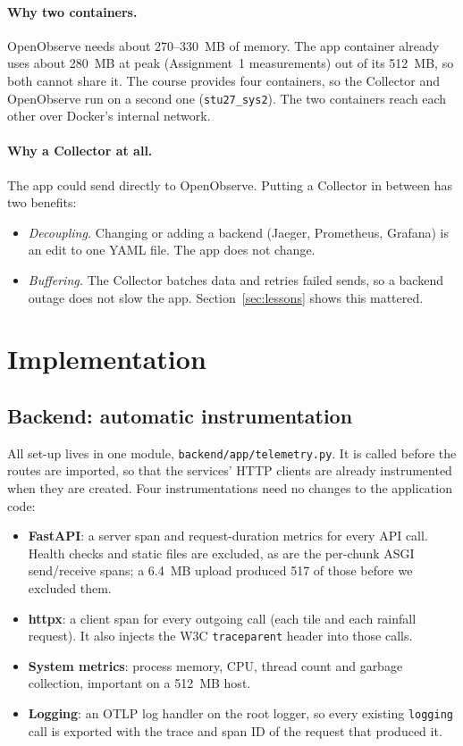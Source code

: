 \documentclass[manuscript,screen]{acmart}
\begin{document}
\paragraph{Why two containers.} OpenObserve needs about 270--330~MB of
memory. The app container already uses about 280~MB at peak (Assignment~1
measurements) out of its 512~MB, so both cannot share it. The course
provides four containers, so the Collector and OpenObserve run on a
second one (\texttt{stu27\_sys2}). The two containers reach each other over
Docker's internal network.

\paragraph{Why a Collector at all.} The app could send directly to
OpenObserve. Putting a Collector in between has two benefits:
\begin{itemize}
\item \emph{Decoupling.} Changing or adding a backend (Jaeger, Prometheus,
  Grafana) is an edit to one YAML file. The app does not change.
\item \emph{Buffering.} The Collector batches data and retries failed
  sends, so a backend outage does not slow the app. Section~\ref{sec:lessons}
  shows this mattered.
\end{itemize}

\section{Implementation}
\label{sec:implementation}

\subsection{Backend: automatic instrumentation}
All set-up lives in one module, \texttt{backend/app/telemetry.py}. It is
called before the routes are imported, so that the services' HTTP clients
are already instrumented when they are created. Four instrumentations
need no changes to the application code:
\begin{itemize}
\item \textbf{FastAPI}: a server span and request-duration metrics for every
  API call. Health checks and static files are excluded, as are the
  per-chunk ASGI send/receive spans; a 6.4~MB upload produced 517 of those
  before we excluded them.
\item \textbf{httpx}: a client span for every outgoing call (each tile and
  each rainfall request). It also injects the W3C \texttt{traceparent}
  header into those calls.
\item \textbf{System metrics}: process memory, CPU, thread count and garbage
  collection, important on a 512~MB host.
\item \textbf{Logging}: an OTLP log handler on the root logger, so every
  existing \texttt{logging} call is exported with the trace and span ID of
  the request that produced it.
\end{itemize}
\end{document}
